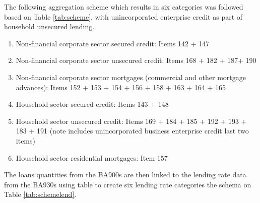 \documentclass[
]{article}
\providecommand{\tightlist}{%
  \setlength{\itemsep}{0pt}\setlength{\parskip}{0pt}}
\begin{document}
The following aggregation scheme which results in six categories was followed based on Table \ref{tab:scheme}, with unincorporated enterprise credit as part of household unsecured lending.

\begin{enumerate}
\def\labelenumi{\alph{enumi}.}
\tightlist
\item
  Non-financial corporate sector secured credit: Items 142 + 147
\item
  Non-financial corporate sector unsecured credit: Items 168 + 182 + 187+ 190
\item
  Non-financial corporate sector mortgages (commercial and other mortgage advances): Items 152 + 153 + 154 + 156 + 158 + 163 + 164 + 165
\item
  Household sector secured credit: Items 143 + 148\\
\item
  Household sector unsecured credit: Items 169 + 184 + 185 + 192 + 193 + 183 + 191 (note includes unincorporated business enterprise credit last two items)
\item
  Household sector residential mortgages: Item 157
\end{enumerate}

\newpage

The loans quantities from the BA900s are then linked to the lending rate data from the BA930s using table to create six lending rate categories the schema on Table \ref{tab:schemelend}.

\providecommand{\docline}[3]{\noalign{\global\setlength{\arrayrulewidth}{#1}}\arrayrulecolor[HTML]{#2}\cline{#3}}

\setlength{\tabcolsep}{0pt}

\renewcommand*{\arraystretch}{0.6}
\end{document}
